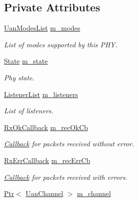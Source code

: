 \subsection*{Private Attributes}
\begin{DoxyCompactItemize}
\item 
\hyperlink{classns3_1_1UanModesList}{Uan\+Modes\+List} \hyperlink{classns3_1_1UanPhyGen_afbefa28eede3c14460aa7d69961de317}{m\+\_\+modes}
\begin{DoxyCompactList}\small\item\em List of modes supported by this P\+HY. \end{DoxyCompactList}\item 
\hyperlink{classns3_1_1UanPhy_afc5e3b6b00589131e4a56ececd42bf9f}{State} \hyperlink{classns3_1_1UanPhyGen_a7c0bda9705a7f5f602707dde48497670}{m\+\_\+state}
\begin{DoxyCompactList}\small\item\em Phy state. \end{DoxyCompactList}\item 
\hyperlink{classns3_1_1UanPhyGen_a722a10230697990a82311b46b59f777a}{Listener\+List} \hyperlink{classns3_1_1UanPhyGen_a3d1397ac54ea932b750497f9b9fcb0fa}{m\+\_\+listeners}
\begin{DoxyCompactList}\small\item\em List of listeners. \end{DoxyCompactList}\item 
\hyperlink{classns3_1_1UanPhy_a0b4ce695657b1c0b7f52ae474f3d98f9}{Rx\+Ok\+Callback} \hyperlink{classns3_1_1UanPhyGen_a78a00aec0ebac16ef76664a77649ddf0}{m\+\_\+rec\+Ok\+Cb}
\begin{DoxyCompactList}\small\item\em \hyperlink{classns3_1_1Callback}{Callback} for packets received without error. \end{DoxyCompactList}\item 
\hyperlink{classns3_1_1UanPhy_ae0da6892a65ba998fb1d649f31b118c4}{Rx\+Err\+Callback} \hyperlink{classns3_1_1UanPhyGen_ace08b70be192456009688df2cf1a56fc}{m\+\_\+rec\+Err\+Cb}
\begin{DoxyCompactList}\small\item\em \hyperlink{classns3_1_1Callback}{Callback} for packets received with errors. \end{DoxyCompactList}\item 
\hyperlink{classns3_1_1Ptr}{Ptr}$<$ \hyperlink{classns3_1_1UanChannel}{Uan\+Channel} $>$ \hyperlink{classns3_1_1UanPhyGen_aaea6ec335cd553c326ef729cb153ce91}{m\+\_\+channel}

\end{DoxyCompactItemize}
